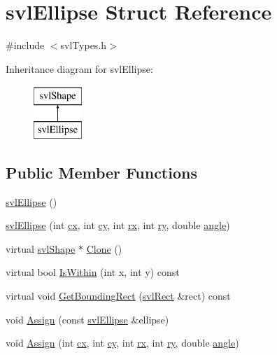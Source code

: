 \hypertarget{structsvl_ellipse}{\section{svl\-Ellipse Struct Reference}
\label{structsvl_ellipse}
}


{\ttfamily \#include $<$svl\-Types.\-h$>$}

Inheritance diagram for svl\-Ellipse\-:\begin{figure}[H]
\begin{center}
\leavevmode
\includegraphics[height=2.000000cm]{d7/d84/structsvl_ellipse}
\end{center}
\end{figure}
\subsection*{Public Member Functions}
\begin{DoxyCompactItemize}
\item 
\hyperlink{structsvl_ellipse_a412fa34eacbcd7ed1202c7cab7548bd5}{svl\-Ellipse} ()
\item 
\hyperlink{structsvl_ellipse_ae4c3ec8ee14a9d5976707c773310d9df}{svl\-Ellipse} (int \hyperlink{structsvl_ellipse_a2365044c025f5bb21a507fd68319b2fe}{cx}, int \hyperlink{structsvl_ellipse_a3e84c8bcbc5c6df40fbd4675afb94f4d}{cy}, int \hyperlink{structsvl_ellipse_a7fe1303950ce19bb57c6894b372221b8}{rx}, int \hyperlink{structsvl_ellipse_a55d904daf9ca0fc87fada3a0607f5043}{ry}, double \hyperlink{structsvl_ellipse_a0d5c04831a5dbd378747bf24cf49b4a3}{angle})
\item 
virtual \hyperlink{structsvl_shape}{svl\-Shape} $\ast$ \hyperlink{structsvl_ellipse_a56c2263e03de504a93fd5003fa63cdc4}{Clone} ()
\item 
virtual bool \hyperlink{structsvl_ellipse_a9f93dab7c7775449c57a5f9a867208ad}{Is\-Within} (int x, int y) const 
\item 
virtual void \hyperlink{structsvl_ellipse_a962597749a29d0815d543bc6324a9c37}{Get\-Bounding\-Rect} (\hyperlink{structsvl_rect}{svl\-Rect} \&rect) const 
\item 
void \hyperlink{structsvl_ellipse_a1b7439a9a57e8c43ca924ad894bbbd3d}{Assign} (const \hyperlink{structsvl_ellipse}{svl\-Ellipse} \&ellipse)
\item 
void \hyperlink{structsvl_ellipse_a71765ccf8d3fde0e0cc1b6d5122324f8}{Assign} (int \hyperlink{structsvl_ellipse_a2365044c025f5bb21a507fd68319b2fe}{cx}, int \hyperlink{structsvl_ellipse_a3e84c8bcbc5c6df40fbd4675afb94f4d}{cy}, int \hyperlink{structsvl_ellipse_a7fe1303950ce19bb57c6894b372221b8}{rx}, int \hyperlink{structsvl_ellipse_a55d904daf9ca0fc87fada3a0607f5043}{ry}, double \hyperlink{structsvl_ellipse_a0d5c04831a5dbd378747bf24cf49b4a3}{angle})
\end{DoxyCompactItemize}
